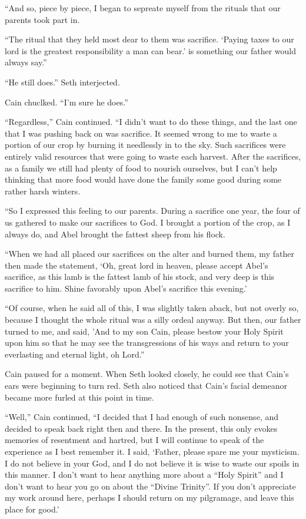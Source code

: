 \documentclass[12pt,twoside,titlepage]{report}
\begin{document}
``And so, piece by piece, I began to sepreate myself from the rituals
that our parents took part in.

``The ritual that they held most dear to them was sacrifice. `Paying
taxes to our lord is the greatest responsibility a man can bear.' is
something our father would always say.''

``He still does.'' Seth interjected.

Cain chuclked. ``I'm sure he does.''

``Regardless,'' Cain continued. ``I didn't want to do these things, and
the last one that I was pushing back on was sacrifice. It seemed wrong
to me to waste a portion of our crop by burning it needlessly in to the
sky. Such sacrifices were entirely valid resources that were going to
waste each harvest. After the sacrifices, as a family we still had
plenty of food to nourish ourselves, but I can't help thinking that more
food would have done the family some good during some rather harsh
winters.

``So I expressed this feeling to our parents. During a sacrifice one
year, the four of us gathered to make our sacrifices to God. I brought a
portion of the crop, as I always do, and Abel brought the fattest sheep
from his flock.

``When we had all placed our sacrifices on the alter and burned them, my
father then made the statement, `Oh, great lord in heaven, please accept
Abel's sacrifice, as this lamb is the fattest lamb of his stock, and
very deep is this sacrifice to him. Shine favorably upon Abel's
sacrifice this evening.'

``Of course, when he said all of this, I was slightly taken aback, but
not overly so, because I thought the whole ritual was a silly ordeal
anyway. But then, our father turned to me, and said, 'And to my son
Cain, please bestow your Holy Spirit upon him so that he may see the
transgressions of his ways and return to your everlasting and eternal
light, oh Lord.''

Cain paused for a moment. When Seth looked closely, he could see that
Cain's ears were beginning to turn red. Seth also noticed that Cain's
facial demeanor became more furled at this point in time.

``Well,'' Cain continued, ``I decided that I had enough of such
nonsense, and decided to speak back right then and there. In the
present, this only evokes memories of resentment and hartred, but I will
continue to speak of the experience as I best remember it. I said,
`Father, please spare me your mysticism. I do not believe in your God,
and I do not believe it is wise to waste our spoils in this manner. I
don't want to hear anything more about a ``Holy Spirit'' and I don't
want to hear you go on about the ``Divine Trinity''. If you don't
appreciate my work around here, perhaps I should return on my
pilgramage, and leave this place for good.'
\end{document}
